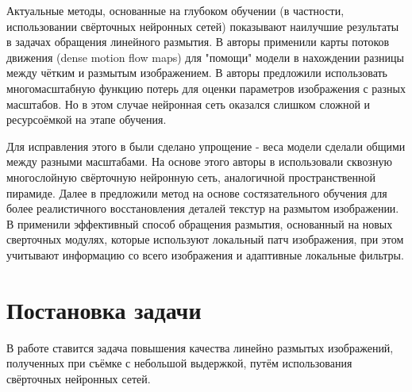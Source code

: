 Актуальные методы, основанные на глубоком обучении (в частности, использовании свёрточных нейронных сетей) показывают наилучшие результаты в задачах обращения линейного размытия.
В \cite{gong} авторы применили карты потоков движения (dense motion flow maps) для "помощи"  модели в нахождении разницы между чётким и размытым изображением.
В \cite{nah} авторы предложили использовать многомасштабную функцию потерь для оценки параметров изображения с разных масштабов. Но в этом случае нейронная сеть оказался слишком сложной и ресурсоёмкой на этапе обучения.

Для исправления этого в \cite{tao, gao} были сделано упрощение - веса модели сделали общими между разными масштабами.
На основе этого авторы в \cite{zhang} использовали сквозную многослойную свёрточную нейронную сеть, аналогичной пространственной пирамиде.
Далее в \cite{dganv2} предложили метод на основе состязательного обучения для более реалистичного восстановления деталей текстур на размытом изображении.
В \cite{suin} применили эффективный способ обращения размытия, основанный на новых сверточных модулях, которые используют локальный патч изображения, 
при этом учитывают информацию со всего изображения и адаптивные локальные фильтры.

\newpage
\section{Постановка задачи}
В работе ставится задача повышения качества линейно размытых изображений, полученных при съёмке с небольшой выдержкой, путём использования свёрточных нейронных сетей.

